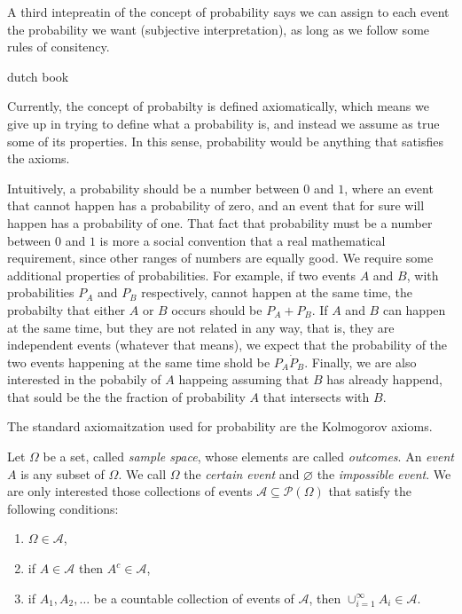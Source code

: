 A third intepreatin of the concept of probability says we can assign to each event the probability we want (subjective interpretation), as long as we follow some rules of consitency.

dutch book

Currently, the concept of probabilty is defined axiomatically, which means we give up in trying to define what a probability is, and instead we assume as true some of its properties. In this sense, probability would be anything that satisfies the axioms.

Intuitively, a probability should be a number between $0$ and $1$, where an event that cannot happen has a probability of zero, and an event that for sure will happen has a probability of one. That fact that probability must be a number between $0$ and $1$ is more a social convention that a real mathematical requirement, since other ranges of numbers are equally good. We require some additional properties of probabilities. For example, if two events $A$ and $B$, with probabilities $P_A$ and $P_B$ respectively, cannot happen at the same time, the probabilty that either $A$ or $B$ occurs should be $P_A + P_B$. If $A$ and $B$ can happen at the same time, but they are not related in any way, that is, they are independent events (whatever that means), we expect that the probability of the two events happening at the same time shold be $P_A \dot P_B$. Finally, we are also interested in the pobabily of $A$ happeing assuming that $B$ has already happend, that sould be the the fraction of probability $A$ that intersects with $B$.

The standard axiomaitzation used for probability are the Kolmogorov axioms.


Let $\Omega$ be a set, called \emph{sample space}, whose elements are called \emph{outcomes}. An \emph{event} $A$ is any subset of $\Omega$. We call $\Omega$ the \emph{certain event} and $\varnothing$ the \emph{impossible event}. We are only interested those collections of events $\mathcal{A} \subseteq \mathcal{P}\left( \Omega \right)$ that satisfy the following conditions:

\begin{enumerate}[label=(\roman*)]
\item $\Omega \in \mathcal{A}$, 
\item if $A \in \mathcal{A}$ then $A^c \in \mathcal{A}$,
\item if $A_1, A_2, \ldots$ be a countable collection of events of $\mathcal{A}$, then $\cup_{i=1}^\infty A_i \in \mathcal{A}$.
\end{enumerate}

